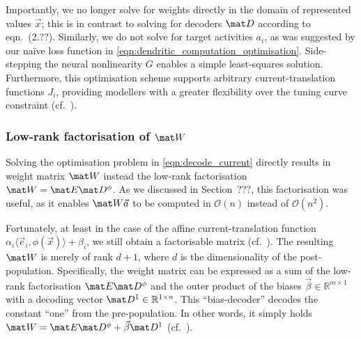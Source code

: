 Importantly, we no longer solve for weights directly in the domain of represented values $\vec x$; this is in contrast to solving for decoders $\mat D$ according to eqn.~(2.??).
Similarly, we do not solve for target activities $a_i$, as was suggested by our na\"ive loss function in \cref{eqn:dendritic_computation_optimisation}.
Side-stepping the neural nonlinearity $G$ enables a simple least-squares solution.
Furthermore, this optimisation scheme supports arbitrary current-translation functions $J_i$, providing modellers with a greater flexibility over the tuning curve constraint (cf.~).

\subsubsection{Low-rank factorisation of $\mat W$}
Solving the optimisation problem in \cref{eqn:decode_current} directly results in weight matrix $\mat W$ instead the low-rank factorisation $\mat W = \mat E \mat D^\phi$.
As we discussed in Section~???, this factorisation was useful, as it enables $\mat W \vec a$ to be computed in $\mathcal{O}(n)$ instead of $\mathcal{O}(n^2)$.

Fortunately, at least in the case of the affine current-translation function $\alpha_i \langle \vec e_i, \phi(\vec x) \rangle + \beta_i$, we still obtain a factorisable matrix (cf.~).
The resulting $\mat W$ is merely of rank $d + 1$, where $d$ is the dimensionality of the post-population.
Specifically, the weight matrix can be expressed as a sum of the low-rank factorisation $\mat E \mat D^\phi$ and the outer product of the biases $\vec \beta \in \mathbb{R}^{m \times 1}$ with a decoding vector $\mat D^1 \in \mathbb{R}^{1 \times n}$.
This \enquote{bias-decoder} decodes the constant \enquote{one} from the pre-population.
In other words, it simply holds $\mat W = \mat E \mat D^\phi + \vec \beta \mat D^1$ (cf.~\cite[Chapter~4]{stockel2017point,duggins2017incorporating}).

